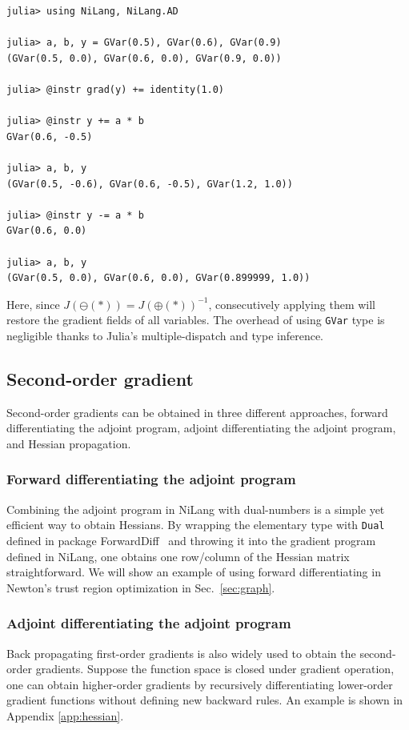 \documentclass{article}
\newcommand{\<}{\langle}
\renewcommand{\>}{\rangle}
\newcommand{\Sec}[1]{Sec.~\ref{#1}}
\newcommand{\App}[1]{Appendix \ref{#1}}
\theoremstyle{definition}\newtheorem{definition}{\textit{Definition}}
\begin{document}
\begin{minipage}{.88\columnwidth}
\begin{lstlisting}[mathescape=true]
julia> using NiLang, NiLang.AD

julia> a, b, y = GVar(0.5), GVar(0.6), GVar(0.9)
(GVar(0.5, 0.0), GVar(0.6, 0.0), GVar(0.9, 0.0))

julia> @instr grad(y) += identity(1.0)

julia> @instr y += a * b
GVar(0.6, -0.5)

julia> a, b, y
(GVar(0.5, -0.6), GVar(0.6, -0.5), GVar(1.2, 1.0))

julia> @instr y -= a * b
GVar(0.6, 0.0)

julia> a, b, y
(GVar(0.5, 0.0), GVar(0.6, 0.0), GVar(0.899999, 1.0))
\end{lstlisting}
\end{minipage}

Here, since $J(\ominus(*)) = J(\oplus(*))^{-1}$, consecutively applying them will restore the gradient fields of all variables.
The overhead of using \texttt{GVar} type is negligible thanks to Julia's multiple-dispatch and type inference.


\subsection{Second-order gradient}
Second-order gradients can be obtained in three different approaches, forward differentiating the adjoint program, adjoint differentiating the adjoint program, and Hessian propagation.
\subsubsection{Forward differentiating the adjoint program}\label{sec:dualhessian}
Combining the adjoint program in NiLang with dual-numbers is a simple yet efficient way to obtain Hessians.
By wrapping the elementary type with \texttt{Dual} defined in package ForwardDiff~\cite{Revels2016} and throwing it into the gradient program defined in NiLang,
one obtains one row/column of the Hessian matrix straightforward.
We will show an example of using forward differentiating in Newton's trust region optimization in \Sec{sec:graph}.

\subsubsection{Adjoint differentiating the adjoint program}\label{sec:simplehessian}
Back propagating first-order gradients is also widely used to obtain the second-order gradients. Suppose the function space is closed under gradient operation, one can obtain higher-order gradients by recursively differentiating lower-order gradient functions without defining new backward rules. An example is shown in \App{app:hessian}.
\end{document}
